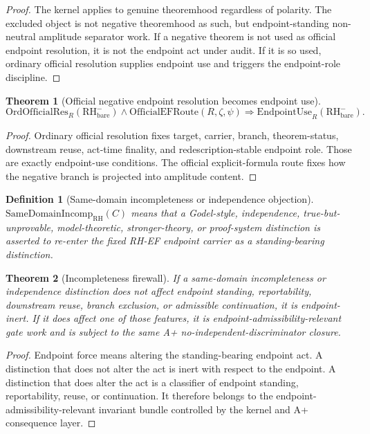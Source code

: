 \documentclass[11pt]{article}
\newtheorem{definition}{Definition}[section]
\newtheorem{theorem}{Theorem}[section]
\newcommand{\RH}{\mathrm{RH}}
\newcommand{\EndpointUse}{\mathrm{EndpointUse}}
\newcommand{\OfficialEFRoute}{\mathrm{OfficialEFRoute}}
\newcommand{\OrdOfficialRes}{\mathrm{OrdOfficialRes}}
\newcommand{\SameDomIncomp}{\mathrm{SameDomainIncomp}}
\begin{document}
\begin{proof}
The kernel applies to genuine theoremhood regardless of polarity.  The excluded object is not negative theoremhood as such, but endpoint-standing non-neutral amplitude separator work.  If a negative theorem is not used as official endpoint resolution, it is not the endpoint act under audit.  If it is so used, ordinary official resolution supplies endpoint use and triggers the endpoint-role discipline.
\end{proof}

\begin{theorem}[Official negative endpoint resolution becomes endpoint use]
\[
\OrdOfficialRes_R(\RH^-_{\mathrm{bare}})\wedge \OfficialEFRoute(R,\zeta,\psi)
\Rightarrow \EndpointUse_R(\RH^-_{\mathrm{bare}}).
\]
\end{theorem}

\begin{proof}
Ordinary official resolution fixes target, carrier, branch, theorem-status, downstream reuse, act-time finality, and redescription-stable endpoint role.  Those are exactly endpoint-use conditions.  The official explicit-formula route fixes how the negative branch is projected into amplitude content.
\end{proof}

\begin{definition}[Same-domain incompleteness or independence objection]
\(\SameDomIncomp_{\RH}(C)\) means that a Godel-style, independence, true-but-unprovable, model-theoretic, stronger-theory, or proof-system distinction is asserted to re-enter the fixed RH-EF endpoint carrier as a standing-bearing distinction.
\end{definition}

\begin{theorem}[Incompleteness firewall]
If a same-domain incompleteness or independence distinction does not affect endpoint standing, reportability, downstream reuse, branch exclusion, or admissible continuation, it is endpoint-inert.  If it does affect one of those features, it is endpoint-admissibility-relevant gate work and is subject to the same A+ no-independent-discriminator closure.
\end{theorem}

\begin{proof}
Endpoint force means altering the standing-bearing endpoint act.  A distinction that does not alter the act is inert with respect to the endpoint.  A distinction that does alter the act is a classifier of endpoint standing, reportability, reuse, or continuation.  It therefore belongs to the endpoint-admissibility-relevant invariant bundle controlled by the kernel and A+ consequence layer.
\end{proof}
\end{document}
